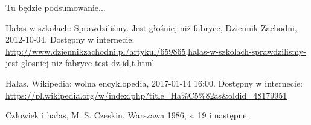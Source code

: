 \documentclass[12pt, a4paper]{article}
\begin{document}
Tu będzie podsumowanie...

\begin{thebibliography}{9}

  Hałas w szkołach: Sprawdziliśmy. Jest głośniej niż fabryce, Dziennik Zachodni, 2012-10-04. Dostępny w internecie: \url{http://www.dziennikzachodni.pl/artykul/659865,halas-w-szkolach-sprawdzilismy-jest-glosniej-niz-fabryce-test-dz,id,t.html}

  Hałas. Wikipedia: wolna encyklopedia, 2017-01-14 16:00. Dostępny w internecie: \url{https://pl.wikipedia.org/w/index.php?title=Ha%C5%82as&oldid=48179951}
  
  Człowiek i hałas, M. S. Czeskin, Warszawa 1986, s. 19 i następne.
  
\end{thebibliography}
\end{document}
